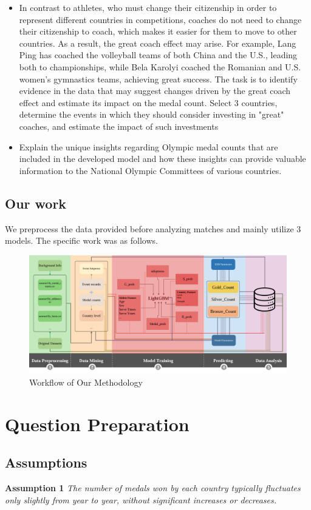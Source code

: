 \documentclass[12pt]{article}  %
\begin{document}
\begin{itemize}
	
	\item In contrast to athletes, who must change their citizenship in order to represent different countries in competitions, coaches do not need to change their citizenship to coach, which makes it easier for them to move to other countries. As a result, the great coach effect may arise. For example, Lang Ping has coached the volleyball teams of both China and the U.S., leading both to championships, while Bela Karolyi coached the Romanian and U.S. women’s gymnastics teams, achieving great success. The task is to identify evidence in the data that may suggest changes driven by the great coach effect and estimate its impact on the medal count. Select 3 countries, determine the events in which they should consider investing in "great" coaches, and estimate the impact of such investments
	\item Explain the unique insights regarding Olympic medal counts that are included in the developed model and how these insights can provide valuable information to the National Olympic Committees of various countries.

\end{itemize}

\subsection{Our work}
We preprocess the data provided before analyzing matches and mainly utilize 3 models. The specific work was as follows.
\begin{figure}[H]
	\centering
	\includegraphics[width=16cm]{img/da.png}
	\caption{Workflow of Our Methodology}
	\label{fig:aa}
\end{figure}


\section{Question Preparation}
\subsection{Assumptions}
\textbf{Assumption 1 } \textit{The number of medals won by each country typically fluctuates only slightly from year to year, without significant increases or decreases.}
\end{document}
